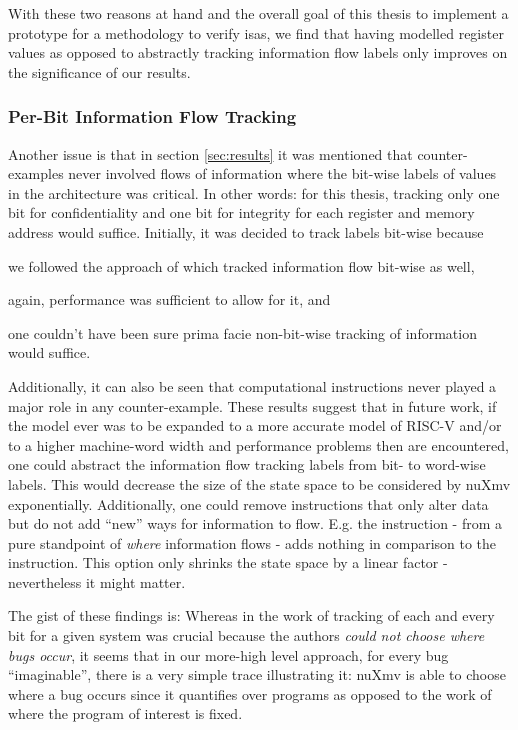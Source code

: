 With these two reasons at hand and the overall goal of this thesis to implement a prototype for a methodology to verify \glspl{isa}, we find that having modelled register values as opposed to abstractly tracking information flow labels only improves on the significance of our results.

\subsubsection{Per-Bit Information Flow Tracking}

Another issue is that in section \ref{sec:results} it was mentioned that counter-examples never involved flows of information where the bit-wise labels of values in the architecture was critical.
In other words: for this thesis, tracking only one bit for confidentiality and one bit for integrity for each register and memory address would suffice.
Initially, it was decided to track labels bit-wise because \begin{enumerate*}[label=\alph*)]
    \item we followed the approach of \citeauthor{Ferraiuolo17} \cite{Ferraiuolo17} which tracked information flow bit-wise as well,
    \item again, performance was sufficient to allow for it, and
    \item one couldn't have been sure prima facie non-bit-wise tracking of information would suffice.
\end{enumerate*}

Additionally, it can also be seen that computational instructions never played a major role in any counter-example.
These results suggest that in future work, if the model ever was to be expanded to a more accurate model of RISC-V and/or to a higher machine-word width and performance problems then are encountered, one could abstract the information flow tracking labels from bit- to word-wise labels.
This would decrease the size of the state space to be considered by nuXmv exponentially.
Additionally, one could remove instructions that only alter data but do not add \enquote{new} ways for information to flow.
E.g. the  instruction - from a pure standpoint of \textit{where} information flows - adds nothing in comparison to the  instruction.
This option only shrinks the state space by a linear factor - nevertheless it might matter.

The gist of these findings is:
Whereas in the work of \citeauthor{Ferraiuolo17} \cite{Ferraiuolo17} tracking of each and every bit for a given system was crucial because the authors \textit{could not choose where bugs occur}, it seems that in our more-high level approach, for every bug \enquote{imaginable}, there is a very simple trace illustrating it: nuXmv is able to choose where a bug occurs since it quantifies over programs as opposed to the work of \citeauthor{Ferraiuolo17} where the program of interest is fixed.
